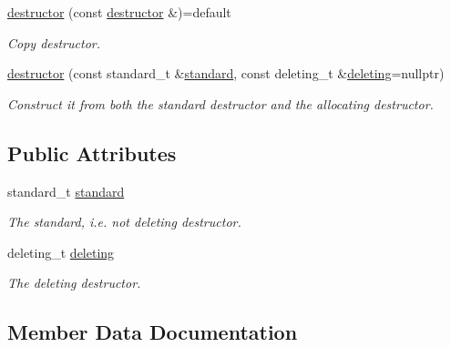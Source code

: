\begin{DoxyCompactItemize}
\mbox{\label{a01360_a45248a911612597c871150e12ad3208b}} 
\hyperlink{a01360_a45248a911612597c871150e12ad3208b}{destructor} (const \hyperlink{a01360}{destructor} \&)=default
\begin{DoxyCompactList}\small\item\em Copy destructor. \end{DoxyCompactList}\item 
\mbox{\label{a01360_abc1f0cdcc708f43049b7d11727e24f24}} 
\hyperlink{a01360_abc1f0cdcc708f43049b7d11727e24f24}{destructor} (const standard\+\_\+t \&\hyperlink{a01360_a5c588780f2142ca3492ea78c62fe472c}{standard}, const deleting\+\_\+t \&\hyperlink{a01360_a96ad279626c7f9b845d47582f9f88dc0}{deleting}=nullptr)
\begin{DoxyCompactList}\small\item\em Construct it from both the standard destructor and the allocating destructor. \end{DoxyCompactList}\end{DoxyCompactItemize}
\subsection*{Public Attributes}
\begin{DoxyCompactItemize}
\item 
standard\+\_\+t \hyperlink{a01360_a5c588780f2142ca3492ea78c62fe472c}{standard}
\begin{DoxyCompactList}\small\item\em The standard, i.\+e. not deleting destructor. \end{DoxyCompactList}\item 
deleting\+\_\+t \hyperlink{a01360_a96ad279626c7f9b845d47582f9f88dc0}{deleting}
\begin{DoxyCompactList}\small\item\em The deleting destructor. \end{DoxyCompactList}\end{DoxyCompactItemize}


\subsection{Member Data Documentation}
\mbox{\label{a01360_a96ad279626c7f9b845d47582f9f88dc0}} 

